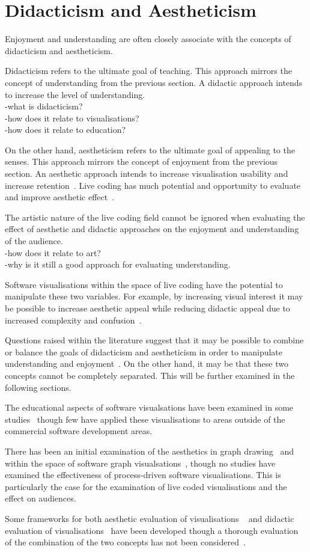 \section{Didacticism and Aestheticism}

Enjoyment and understanding are often closely associate with the concepts of didacticism and aestheticism.

Didacticism refers to the ultimate goal of teaching. This approach mirrors the concept of understanding from the previous section. A didactic approach intends to increase the level of understanding.\\
-what is didacticism?\\
-how does it relate to visualisations?\\
-how does it relate to education?

On the other hand, aestheticism refers to the ultimate goal of appealing to the senses. This approach mirrors the concept of enjoyment from the previous section. An aesthetic approach intends to increase visualisation usability and increase retention~\cite{Cawthon2007}. Live coding has much potential and opportunity to evaluate and improve aesthetic effect~\cite{Bell}.

The artistic nature of the live coding field cannot be ignored when evaluating the effect of aesthetic and didactic approaches on the enjoyment and understanding of the audience.\\
-how does it relate to art?\\
-why is it still a good approach for evaluating understanding.

Software visualisations within the space of live coding have the potential to manipulate these two variables. For example, by increasing visual interest it may be possible to increase aesthetic appeal while reducing didactic appeal due to increased complexity and confusion~.

Questions raised within the literature suggest that it may be possible to combine or balance the goals of didacticism and aestheticism in order to manipulate understanding and enjoyment~. On the other hand, it may be that these two concepts cannot be completely separated. This will be further examined in the following sections.

The educational aspects of software visualsations have been examined in some studies~ though few have applied these visualisations to areas outside of the commercial software development areas.

There has been an initial examination of the aesthetics in graph drawing~ and within the space of software graph visualsations~, though no studies have examined the effectiveness of process-driven software visualisations. This is particularly the case for the examination of live coded visualisations and the effect on audiences.

Some frameworks for both aesthetic evaluation of visualisations
~ and didactic evaluation of visualisations~ have been developed though a thorough evaluation of the combination of the two concepts has not been considered~.


